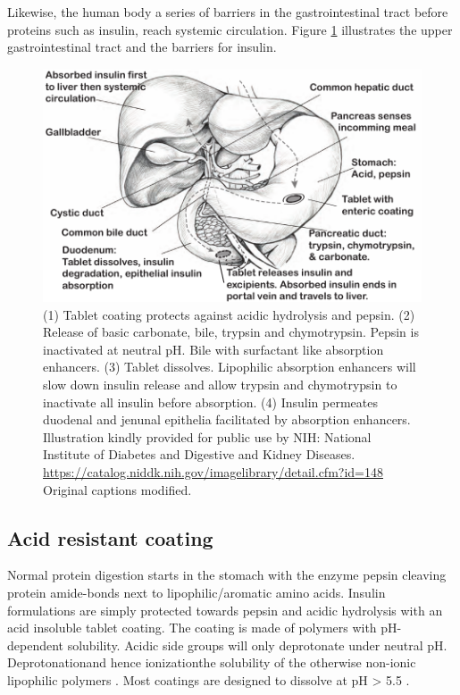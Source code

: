 Likewise, the human body \DIFdelbegin {}\DIFdelend \DIFaddbegin {}\DIFaddend a series of barriers in the gastrointestinal tract before proteins such as insulin, reach systemic circulation. Figure \ref{intro_anatomy} illustrates the upper gastrointestinal tract and the barriers for insulin.

\begin{figure}[!htbp]
\includegraphics[width=\textwidth,height=\textheight,keepaspectratio]{graphics/intro_anatomy2.pdf}
\caption{(1) Tablet coating protects against acidic hydrolysis and pepsin. (2) Release of basic carbonate, bile, trypsin and chymotrypsin. Pepsin is inactivated at neutral pH. Bile \DIFdelbeginFL {}\DIFdelendFL \DIFaddbeginFL {}\DIFaddendFL with surfactant like absorption enhancers. (3) Tablet dissolves. Lipophilic absorption enhancers will slow down insulin release and allow trypsin and chymotrypsin to inactivate all insulin before absorption. (4) Insulin permeates duodenal and jenunal epithelia facilitated by absorption enhancers. Illustration kindly provided for public use by NIH: National Institute of Diabetes and Digestive and Kidney Diseases. \url{https://catalog.niddk.nih.gov/imagelibrary/detail.cfm?id=148} Original captions modified.}
\label{intro_anatomy}
\end{figure}


\subsection{Acid resistant coating}
 Normal protein digestion starts in the stomach with the enzyme pepsin cleaving protein amide-bonds next to lipophilic/aromatic amino acids. Insulin formulations are simply protected towards pepsin and acidic hydrolysis with an acid insoluble tablet coating. The coating is made of polymers with pH-dependent solubility. Acidic side groups will only deprotonate under neutral pH. Deprotonation\DIFaddbegin \DIFadd{, }\DIFaddend and hence ionization\DIFdelbegin {}\DIFdelend \DIFaddbegin {}\DIFaddend the solubility of the otherwise non-ionic lipophilic polymers \cite{carino1999oral,gabor2010improving}. Most coatings are designed to dissolve at pH > 5.5 \cite{maher2014formulation}.

